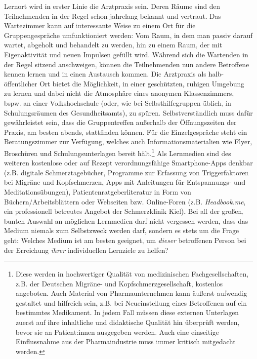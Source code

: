 \documentclass[
  twoside,
  parskip=half-,
  paper=176mm:246mm,
  BCOR=14mm,
  DIV=14,
]{scrreprt}
\begin{document}
\begin{praxis}
  Lernort wird in erster Linie die Arztpraxis sein. Deren Räume sind den Teilnehmenden in der Regel schon jahrelang bekannt und vertraut. Das Wartezimmer kann auf interessante Weise zu einem Ort für die Gruppengespräche umfunktioniert werden: Vom Raum, in dem man passiv darauf wartet, abgeholt und behandelt zu werden, hin zu einem Raum, der mit Eigenaktivität und neuen Impulsen gefüllt wird. Während sich die Wartenden in der Regel sitzend anschweigen, können die Teilnehmenden nun andere Betroffene kennen lernen und in einen Austausch kommen. Die Arztpraxis als halb-öffentlicher Ort bietet die Möglichkeit, in einer geschützten, ruhigen Umgebung zu lernen und dabei nicht die Atmosphäre eines anonymen Klassenzimmers, bspw. an einer Volkshochschule (oder, wie bei Selbsthilfegruppen üblich, in Schulungsräumen des Gesundheitsamts), zu spüren. Selbstverständlich muss dafür gewährleistet sein, dass die Gruppentreffen außerhalb der Öffnungszeiten der Praxis, am besten abends, stattfinden können. Für die Einzelgespräche steht ein Beratungszimmer zur Verfügung, welches auch Informationsmaterialien wie Flyer, Broschüren und Schulungsunterlagen bereit hält.\footnote{Diese werden in hochwertiger Qualität von medizinischen Fachgesellschaften, z.B. der Deutschen Migräne- und Kopfschmerzgesellschaft, kostenlos angeboten. Auch Material von Pharmaunternehmen kann äußerst aufwendig gestaltet und hilfreich sein, z.B. bei Neueinstellung eines Betroffenen auf ein bestimmtes Medikament. In jedem Fall müssen diese externen Unterlagen zuerst auf ihre inhaltliche und didaktische Qualität hin überprüft werden, bevor sie an Patient:innen ausgegeben werden. Auch eine einseitige Einflussnahme aus der Pharmaindustrie muss immer kritisch mitgedacht werden.} Als Lernmedien sind des weiteren kostenlose oder auf Rezept verordnungsfähige Smartphone-Apps denkbar (z.B. digitale Schmerztagebücher, Programme zur Erfassung von Triggerfaktoren bei Migräne und Kopfschmerzen, Apps mit Anleitungen für Entspannungs- und Meditationsübungen), Patientenratgeberliteratur in Form von Büchern/Arbeitsblättern oder Webseiten bzw. Online-Foren (z.B. \textit{Headbook.me}, ein professionell betreutes Angebot der Schmerzklinik Kiel). Bei all der großen, bunten Auswahl an möglichen Lernmedien darf nicht vergessen werden, dass das Medium niemals zum Selbstzweck werden darf, sondern es stets um die Frage geht: Welches Medium ist am besten geeignet, um \textit{dieser} betroffenen Person bei der Erreichung \textit{ihrer} individuellen Lernziele zu helfen? 
\end{praxis}
\end{document}
